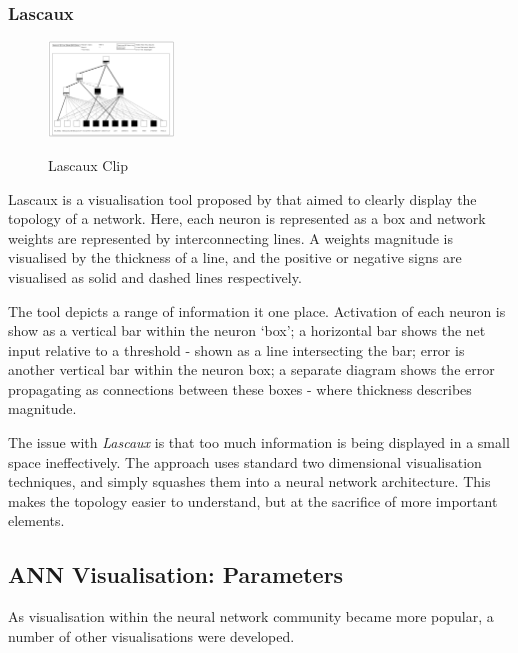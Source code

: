 \documentclass[a4paper,11pt,titlepage]{article}
\begin{document}
		\subsubsection{Lascaux}
 		
	\begin{figure}[H]
    			\centering	
			{{\includegraphics[width=0.3\textwidth]
    				{img/craven_weights.png} 
    			}}%
    			\caption{Lascaux Clip}%
    		\label{fig:lascaux}
	\end{figure}  		
 		
		Lascaux is a visualisation tool proposed by \cite{Craven1992} that aimed to clearly display the topology of a network. Here, each neuron is represented as a box and network weights are represented by interconnecting lines. A weights magnitude is visualised by the thickness of a line, and the positive or negative signs are visualised as solid and dashed lines respectively.
		\par 
		The tool depicts a range of information it one place. Activation of each neuron is show as a vertical bar within the neuron `box'; a horizontal bar shows the net input relative to a threshold - shown as a line intersecting the bar; error is another vertical bar within the neuron box; a separate diagram shows the error propagating as connections between these boxes - where thickness describes magnitude.
		\par 
		The issue with \textit{Lascaux} is that too much information is being displayed in a small space ineffectively. The approach uses standard two dimensional visualisation techniques, and simply squashes them into a neural network architecture. This makes the topology easier to understand, but at the sacrifice of more important elements.

	\subsection{ANN Visualisation: Parameters}
	As visualisation within the neural network community became more popular, a number of other visualisations were developed.
\end{document}
